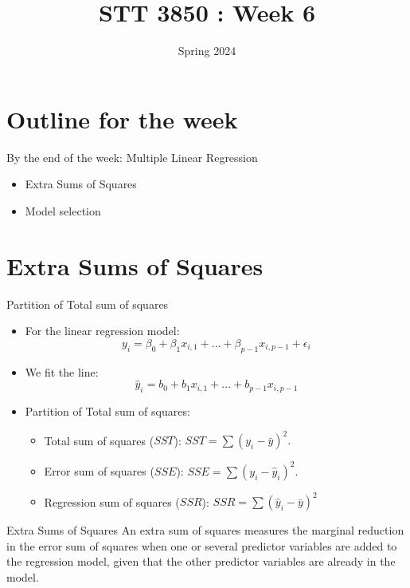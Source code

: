 \documentclass[
  ignorenonframetext,
]{beamer}
\title{STT 3850 : Week 6}
\author{Spring 2024}
\date{}
\institute{Appalachian State University}
\providecommand{\tightlist}{%
  \setlength{\itemsep}{0pt}\setlength{\parskip}{0pt}}
\begin{document}
\frame{\titlepage}

\hypertarget{outline-for-the-week}{%
\section{Outline for the week}\label{outline-for-the-week}}

\begin{frame}{By the end of the week: Multiple Linear Regression}
\protect\hypertarget{by-the-end-of-the-week-multiple-linear-regression}{}
\begin{itemize}
\tightlist
\item
  Extra Sums of Squares
\item
  Model selection
\end{itemize}
\end{frame}

\hypertarget{extra-sums-of-squares}{%
\section{Extra Sums of Squares}\label{extra-sums-of-squares}}

\begin{frame}{Partition of Total sum of squares}
\protect\hypertarget{partition-of-total-sum-of-squares}{}
\begin{itemize}
\item
  For the linear regression model:
  \[y_i=\beta_0+\beta_1x_{i,1}+\ldots + \beta_{p-1}x_{i,p-1}+\epsilon_i\]
\item
  We fit the line:
  \[\hat{y}_i=b_0+b_1x_{i,1}+\ldots + b_{p-1}x_{i,p-1}\]
\item
  Partition of Total sum of squares:

  \begin{itemize}
  \item
    Total sum of squares (\(SST\)): \(SST=\sum(y_i-\bar{y})^2.\)
  \item
    Error sum of squares (\(SSE\)): \(SSE=\sum (y_i-\hat{y}_i)^2.\)
  \item
    Regression sum of squares (\(SSR\)):
    \(SSR=\sum (\hat{y}_i-\bar{y})^2\)
  \end{itemize}
\end{itemize}
\end{frame}

\begin{frame}{Extra Sums of Squares}
\protect\hypertarget{extra-sums-of-squares-1}{}
An extra sum of squares measures the marginal reduction in the error sum
of squares when one or several predictor variables are added to the
regression model, given that the other predictor variables are already
in the model.
\end{frame}
\end{document}
